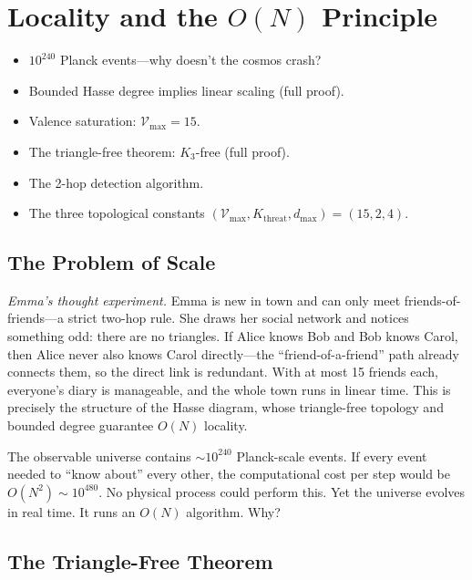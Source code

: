 \documentclass[11pt, a4paper, openany]{book}
\newcounter{thm}[chapter]
\newenvironment{introduction}[1][Modulo Overview]{%
  \begin{tcolorbox}[
    enhanced,colback=structure!5,colframe=structure,
    colbacktitle=structure,coltitle=white,
    fonttitle=\small\bfseries,title={#1},
    arc=2pt,boxrule=0.7pt,
    left=8pt,right=8pt,top=6pt,bottom=6pt,
    before skip=12pt,after skip=12pt
  ]\itshape\begin{itemize}[leftmargin=*,itemsep=2pt,parsep=0pt]
}{%
  \end{itemize}\end{tcolorbox}
}
\begin{document}
\chapter{Locality and the $O(N)$ Principle}\label{ch:locality}

\begin{introduction}
  \item $10^{240}$ Planck events---why doesn't the cosmos crash?
  \item Bounded Hasse degree implies linear scaling (full proof).
  \item Valence saturation: $\mathcal{V}_{\max} = 15$.
  \item The triangle-free theorem: $K_3$-free (full proof).
  \item The 2-hop detection algorithm.
  \item The three topological constants $(\mathcal{V}_{\max}, K_{\mathrm{threat}}, d_{\max}) = (15, 2, 4)$.
\end{introduction}

\section{The Problem of Scale}

\smallskip\noindent
\textit{Emma's thought experiment.}
Emma is new in town and can only meet friends-of-friends---a strict
two-hop rule. She draws her social network and notices something odd:
there are no triangles. If Alice knows Bob and Bob knows Carol, then
Alice never also knows Carol directly---the ``friend-of-a-friend'' path
already connects them, so the direct link is redundant. With at most 15
friends each, everyone's diary is manageable, and the whole town runs in
linear time. This is precisely the structure of the Hasse diagram, whose
triangle-free topology and bounded degree guarantee $O(N)$ locality.
\smallskip

\noindent
The observable universe contains $\sim 10^{240}$ Planck-scale events. If
every event needed to ``know about'' every other, the computational cost
per step would be $O(N^2) \sim 10^{480}$. No physical process could
perform this. Yet the universe evolves in real time. It runs an $O(N)$
algorithm. Why?

\section{The Triangle-Free Theorem}\label{sec:triangle-free}
\end{document}
